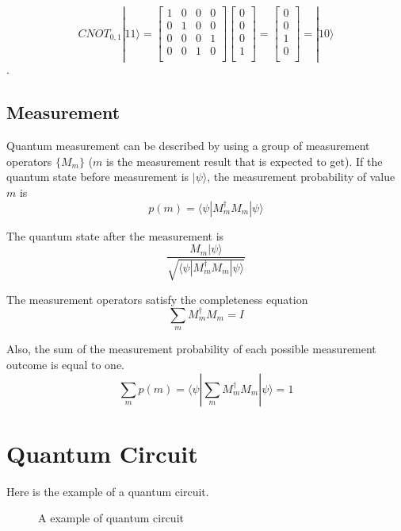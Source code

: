 \begin{equation}
CNOT_{0,1}|11\rangle = 
\begin{bmatrix}
1 & 0 & 0 & 0 \\
0 & 1 & 0 & 0 \\
0 & 0 & 0 & 1 \\
0 & 0 & 1 & 0 \\
\end{bmatrix}
 \left[
\begin{array}{c}
0 \\
0 \\
0 \\
1 \\
\end{array}
\right]
=  \left[
\begin{array}{c}
0 \\
0 \\
1 \\
0 \\
\end{array}
\right] 
= |10\rangle 
\end{equation}.

\subsection{Measurement}
Quantum measurement can be described by using a group of measurement operators $\{M_m\}$
($m$ is the measurement result that is expected to get).
 If the quantum state before measurement is $|\psi\rangle$, the measurement probability of value $m$ is 
 $$p(m) = \langle \psi|M^{\dagger}_m M_m|\psi\rangle$$

 The quantum state after the measurement is 
 $$\frac{M_m|\psi\rangle}{\sqrt{\langle \psi|M^{\dagger}_m M_m|\psi\rangle}}$$

The measurement operators satisfy the completeness equation
$$\sum_{m} M^{\dagger}_m M_m = I$$

Also, the sum of the measurement probability of each possible measurement outcome is equal to one.
$$\sum_{m} p(m) = \langle \psi|\sum_{m} M^{\dagger}_m M_m|\psi\rangle = 1$$


\section{Quantum Circuit}
Here is the example of a quantum circuit.

\begin{figure}[ht]
  \begin{center}
\caption{A example of quantum circuit}
\end{center}
\end{figure}

